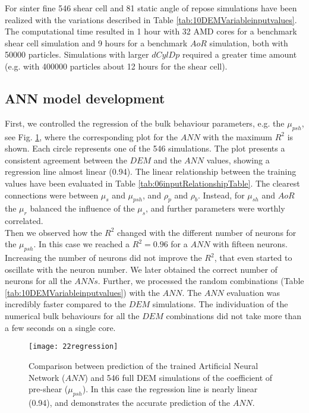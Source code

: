 \documentclass[review]{elsarticle}
\begin{document}
For sinter fine 546 shear cell and 81 static angle of repose simulations have
been realized with the variations described in Table
\ref{tab:10DEMVariableinputvalues}.
The computational time resulted in 1 hour with 32 AMD cores for a benchmark
shear cell simulation and 9 hours for a benchmark $AoR$ simulation, both with
50000 particles.
Simulations with larger $dCylDp$ required a greater time amount (e.g. with
400000 particles about 12 hours for the shear cell). \\


\subsection{ANN model development}
\label{subsec:annmodeldev}

First, we controlled the regression of the bulk behaviour parameters, e.g. the
$\mu_{psh}$, see Fig. \ref{fig:22regression}, where the corresponding plot for
the $ANN$ with the maximum $R^2$ is shown. Each circle represents one of the 546
simulations.
The plot presents a consistent agreement between the 
$DEM$ and the $ANN$ values, showing a regression line almost linear (0.94).
The linear relationship between the
training values have been evaluated in Table \ref{tab:06inputRelationshipTable}.
The clearest connections were between $\mu_s$ and $\mu_{psh}$, and
$\rho_p$ and $\rho_b$.
Instead, for $\mu_{sh}$ and $AoR$ the $\mu_r$ balanced the influence of the 
$\mu_s$, and further parameters were worthly correlated. \\
Then we observed how the $R^2$ changed with the different number of neurons for the $\mu_{psh}$. 
In this case we reached a $R^2 = 0.96$ for a $ANN$ with fifteen neurons. 
Increasing the number of neurons did not improve the $R^2$, that even started to oscillate with the neuron number. 
We later obtained the correct number of neurons for all the $ANNs$.
Further, we processed the random combinations (Table
\ref{tab:10DEMVariableinputvalues}) with the $ANN$.
The $ANN$ evaluation was incredibly faster compared to the $DEM$ simulations. The
individuation of the numerical bulk behaviours for all the $DEM$ combinations
did not take more than a few seconds on a single core.
\begin{figure}[!h] 
\centering 
\texttt{[image: 22regression]}
\caption[Comparison between prediction of the trained NN and full DEM
simulation]{Comparison between prediction of the trained Artificial Neural
Network ($ANN$) and 546 full DEM simulations of the coefficient of pre-shear
($\mu_{psh}$). In this case the regression line is nearly linear (0.94), and
demonstrates the accurate prediction of the $ANN$.}
\label{fig:22regression} 
\end{figure}
\end{document}
